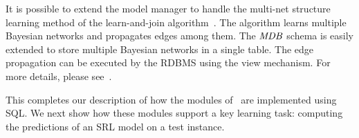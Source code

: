 \documentclass{IEEEtran}
\begin{document}
It is possible to extend the model manager to handle the multi-net structure learning method of the learn-and-join algorithm~\cite{Schulte2012}. The algorithm learns multiple Bayesian networks and propagates edges among them. The $\it{MDB }$ schema is easily extended to store multiple Bayesian networks in a single table. The edge propagation can be executed by the RDBMS using the view mechanism. For more details, please see~\cite{bib:bbsite}. 

This completes our description of how the modules of \FB\ are implemented using SQL. We next show how these modules support a key learning task: computing the predictions of an SRL model on a test instance. 

%
\end{document}
